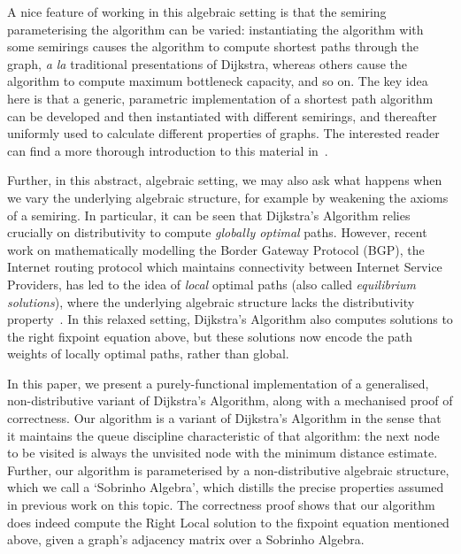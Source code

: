A nice feature of working in this algebraic setting is that the semiring parameterising the algorithm can be varied: instantiating the algorithm with some semirings causes the algorithm to compute shortest paths through the graph, \emph{a la} traditional presentations of Dijkstra, whereas others cause the algorithm to compute maximum bottleneck capacity, and so on.
The key idea here is that a generic, parametric implementation of a shortest path algorithm can be developed and then instantiated with different semirings, and thereafter uniformly used to calculate different properties of graphs.
The interested reader can find a more thorough introduction to this material in~\cite{gondran_graphs_2008, mohri:semiring:2002}.

Further, in this abstract, algebraic setting, we may also ask what happens when we vary the underlying algebraic structure, for example by weakening the axioms of a semiring.
In particular, it can be seen that Dijkstra's Algorithm relies crucially on distributivity to compute \emph{globally optimal} paths.
However, recent work on mathematically modelling the Border Gateway Protocol (BGP), the Internet routing protocol which maintains connectivity between Internet Service Providers, has led to the idea of \emph{local} optimal paths (also called \emph{equilibrium solutions}), where the underlying algebraic structure lacks the distributivity property~\cite{sobrinho_routing_2010}.
In this relaxed setting, Dijkstra's Algorithm also computes solutions to the right fixpoint equation above, but these solutions now encode the path weights of locally optimal paths, rather than global.

In this paper, we present a purely-functional implementation of a generalised, non-distributive variant of Dijkstra's Algorithm, along with a mechanised proof of correctness.
Our algorithm is a variant of Dijkstra's Algorithm in the sense that it maintains the queue discipline characteristic of that algorithm: the next node to be visited is always the unvisited node with the minimum distance estimate.
Further, our algorithm is parameterised by a non-distributive algebraic structure, which we call a `Sobrinho Algebra', which distills the precise properties assumed in previous work on this topic.
The correctness proof shows that our algorithm does indeed compute the Right Local solution to the fixpoint equation mentioned above, given a graph's adjacency matrix over a Sobrinho Algebra.

